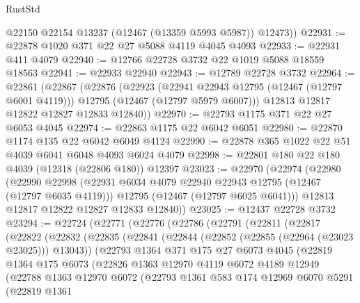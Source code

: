 \begin{lexlean}{RustStd}
\begin{coremodule}
        @22150
        @22154
        @13237
        (@12467 (@13359 @5993 @5987))
        @12473))
@22931 := @22878 @1020 @371 @22 @27 @5088 @4119 @4045 @4093
@22933 := @22931 @411 @4079
@22940 := @12766 @22728 @3732 @22 @1019 @5088 @18559 @18563
@22941 := @22933 @22940
@22943 := @12789 @22728 @3732
@22964 := @22861
    (@22867
      (@22876
        (@22923
          (@22941 @22943 @12795 (@12467 (@12797 @6001 @4119)))
          @12795
          (@12467 (@12797 @5979 @6007)))
        @12813
        @12817
        @12822
        @12827
        @12833
        @12840))
@22970 := @22793 @1175 @371 @22 @27 @6053 @4045
@22974 := @22863 @1175 @22 @6042 @6051
@22980 := @22870 @1174 @135 @22 @6042 @6049 @4124
@22990 := @22878 @365 @1022 @22 @51 @4039 @6041 @6048 @4093 @6024 @4079
@22998 := @22801 @180 @22 @180 @4039 (@12318 (@22806 @180)) @12397
@23023 := @22970
    (@22974
      (@22980
        (@22990
          @22998
          (@22931 @6034 @4079 @22940 @22943 @12795 (@12467 (@12797 @6035 @4119)))
          @12795
          (@12467 (@12797 @6025 @6041)))
        @12813
        @12817
        @12822
        @12827
        @12833
        @12840))
@23025 := @12437 @22728 @3732
@23294 := @22724
    (@22771
      (@22776
        (@22786
          (@22791
            (@22811
              (@22817
                (@22822
                  (@22832
                    (@22835
                      (@22841
                        (@22844 (@22852 (@22855 (@22964 (@23023 @23025))) @13043))
                        (@22793
                          @1364
                          @371
                          @175
                          @27
                          @6073
                          @4045
                          (@22819
                            @1364
                            @175
                            @6073
                            (@22826
                              @1363
                              @12970
                              @4119
                              @6072
                              @4189
                              @12949
                              (@22788
                                @1363
                                @12970
                                @6072
                                (@22793
                                  @1361
                                  @583
                                  @174
                                  @12969
                                  @6070
                                  @5291
                                  (@22819
                                    @1361

\end{coremodule}
\end{lexlean}
